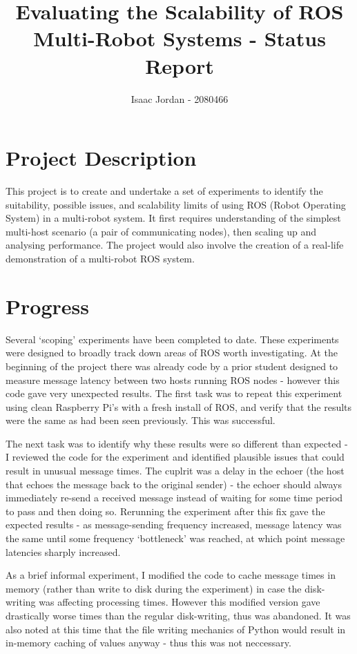 \documentclass[11pt]{article}
\title{Evaluating the Scalability of ROS Multi-Robot Systems - Status Report}
\author{Isaac Jordan - 2080466}
\begin{document}
\maketitle

\section{Project Description}

This project is to create and undertake a set of experiments to identify the suitability, possible issues, and scalability limits of using ROS (Robot Operating System) in a multi-robot system. It first requires understanding of the simplest multi-host scenario (a pair of communicating nodes), then scaling up and analysing performance. The project would also involve the creation of a real-life demonstration of a multi-robot ROS system.

\section{Progress}

Several `scoping' experiments have been completed to date. These experiments were designed to broadly track down areas of ROS worth investigating. At the beginning of the project there was already code by a prior student designed to measure message latency between two hosts running ROS nodes - however this code gave very unexpected results. The first task was to repeat this experiment using clean Raspberry Pi's with a fresh install of ROS, and verify that the results were the same as had been seen previously. This was successful.

The next task was to identify why these results were so different than expected - I reviewed the code for the experiment and identified plausible issues that could result in unusual message times. The cuplrit was a delay in the echoer (the host that echoes the message back to the original sender) - the echoer should always immediately re-send a received message instead of waiting for some time period to pass and then doing so. Rerunning the experiment after this fix gave the expected results - as message-sending frequency increased, message latency was the same until some frequency `bottleneck' was reached, at which point message latencies sharply increased.

As a brief informal experiment, I modified the code to cache message times in memory (rather than write to disk during the experiment) in case the disk-writing was affecting processing times. However this modified version gave drastically worse times than the regular disk-writing, thus was abandoned. It was also noted at this time that the file writing mechanics of Python would result in in-memory caching of values anyway - thus this was not neccessary.
\end{document}

